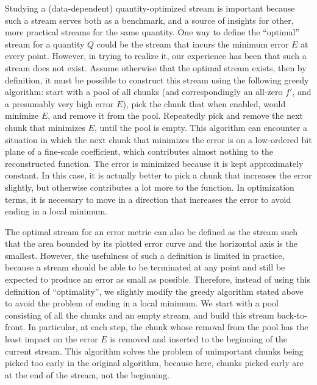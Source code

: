 Studying a (data-dependent) quantity-optimized stream is important because such a stream serves both
as a benchmark, and a source of insights for other, more practical streams for the same quantity.
One way to define the ``optimal'' stream for a quantity $Q$ could be the stream that incurs the
minimum error $E$ at every point. However, in trying to realize it, our experience has been that
such a stream does not exist. Assume otherwise that the optimal stream exists, then by definition,
it must be possible to construct this stream using the following greedy algorithm: start with a pool
of all chunks (and correspondingly an all-zero $f'$, and a presumably very high error $E$), pick
the chunk that when enabled, would minimize $E$, and remove it from the pool. Repeatedly pick and
remove the next chunk that minimizes $E$, until the pool is empty. This algorithm can
encounter a situation in which the next chunk that minimizes the error is on a low-ordered bit plane
of a fine-scale coefficient, which contributes almost nothing to the reconstructed function. The
error is minimized because it is kept approximately constant. In this case, it is actually better to
pick a chunk that increases the error slightly, but otherwise contributes a lot more to the
function. In optimization terms, it is necessary to move in a direction that increases the error to
avoid ending in a local minimum.

The optimal stream for an error metric can also be defined as the stream such that the area bounded
by its plotted error curve and the horizontal axis is the smallest. However, the usefulness of such
a definition is limited in practice, because a stream should be able to be terminated at any point
and still be expected to produce an error as small as possible. Therefore, instead of using this
definition of ``optimality'', we slightly modify the greedy algorithm stated above to avoid the
problem of ending in a local minimum. We start with a pool consisting of all the chunks and an
empty stream, and build this stream back-to-front. In particular, at each step, the chunk whose
removal from the pool has the least impact on the error $E$ is removed and inserted to the beginning
of the current stream. This algorithm solves the problem of unimportant chunks being picked too
early in the original algorithm, because here, chunks picked early are at the end of the
stream, not the beginning.

